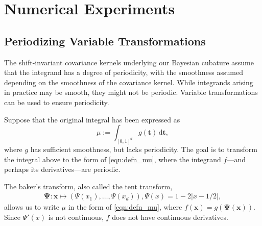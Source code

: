 \documentclass{svjour3}                     %
\newcommand{\bm}[1]{\boldsymbol{#1}}
\newcommand{\dif}[1]{\text{d}{#1}}
\newcommand{\vt}{\bm{t}}
\newcommand{\vx}{\bm{x}}
\newcommand{\vPsi}{\boldsymbol{\Psi}}
\def\abs#1{\ensuremath{\left \lvert #1 \right \rvert}}
\begin{document}
\section{Numerical Experiments} \label{sec:NumExp}

\subsection{Periodizing Variable Transformations}
\label{period_var_tx}
The shift-invariant covariance kernels underlying our Bayesian cubature  assume that the integrand has a degree of periodicity, with the smoothness assumed depending on the smoothness of the covariance kernel.  While integrands arising in practice may be smooth, they might not be periodic.  Variable transformations can be used to ensure periodicity.

Suppose that the original integral has been expressed as 
\begin{equation*}
\mu := \int_{[0,1]^d} g(\vt) \, \dif \vt,
\end{equation*}
where $g$ has sufficient smoothness, but lacks periodicity.  
The goal is to transform the integral above to the form of \eqref{eqn:defn_mu}, where the integrand $f$---and perhaps its derivatives---are  periodic.  

The baker's transform, also called the tent transform,
\begin{align} \label{eq:bakerTrans}
\vPsi: \vx \mapsto (\Psi(x_1),  \ldots, \Psi(x_d)),  \Psi(x)  =1 - 2 \abs{x - 1/2},
\end{align}
allows us to write $\mu$ in the form of \eqref{eqn:defn_mu}, where $f(\vx) = g(\vPsi(\vx))$.  Since  $\Psi'(x)$ is not continuous, $f$ does not have continuous derivatives. 
\end{document}
